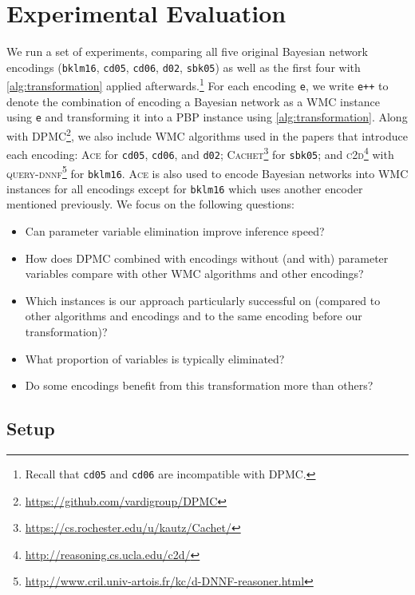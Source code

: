 \section{Experimental Evaluation}

We run a set of experiments, comparing all five original Bayesian network
encodings (\texttt{bklm16}, \texttt{cd05}, \texttt{cd06}, \texttt{d02},
\texttt{sbk05}) as well as the first four with \cref{alg:transformation} applied
afterwards.\footnote{Recall that \texttt{cd05} and \texttt{cd06} are
  incompatible with \textsc{DPMC}.} For each encoding \texttt{e}, we write
\texttt{e++} to denote the combination of encoding a Bayesian network as a WMC
instance using \texttt{e} and transforming it into a PBP instance using
\cref{alg:transformation}. Along with
\textsc{DPMC}\footnote{\url{https://github.com/vardigroup/DPMC}}, we also
include WMC algorithms used in the papers that introduce each encoding:
\textsc{Ace} for \texttt{cd05}, \texttt{cd06}, and \texttt{d02};
\textsc{Cachet}\footnote{\url{https://cs.rochester.edu/u/kautz/Cachet/}}
\citep{DBLP:conf/sat/SangBBKP04} for \texttt{sbk05}; and
\textsc{c2d}\footnote{\url{http://reasoning.cs.ucla.edu/c2d/}}
\citep{DBLP:conf/ecai/Darwiche04} with
\textsc{query-dnnf}\footnote{\url{http://www.cril.univ-artois.fr/kc/d-DNNF-reasoner.html}}
for \texttt{bklm16}. \textsc{Ace} is also used to encode Bayesian networks into
WMC instances for all encodings except for \texttt{bklm16} which uses another
encoder mentioned previously. We focus on the following questions:
\begin{itemize}
  \item Can parameter variable elimination improve inference speed?
  \item How does \textsc{DPMC} combined with encodings without (and with)
        parameter variables compare with other WMC algorithms and other
        encodings?
  \item Which instances is our approach particularly successful on (compared to
        other algorithms and encodings and to the same encoding before our
        transformation)?
  \item What proportion of variables is typically eliminated?
  \item Do some encodings benefit from this transformation more than others?
\end{itemize}

\subsection{Setup}

